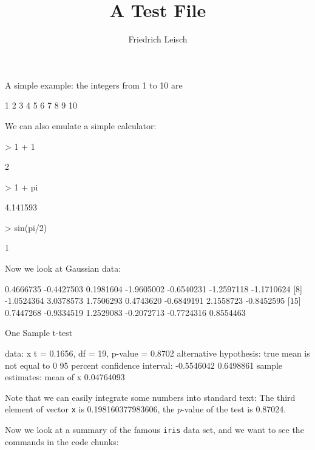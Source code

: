 \documentclass[a4paper]{article}
\title{A Test File}
\author{Friedrich Leisch}
\begin{document}
\maketitle

A simple example: the integers from 1 to 10 are
\begin{Schunk}
\begin{Soutput}
 [1]  1  2  3  4  5  6  7  8  9 10
\end{Soutput}
\end{Schunk}

We can also emulate a simple calculator:
\begin{Schunk}
\begin{Sinput}
> 1 + 1
\end{Sinput}
\begin{Soutput}
[1] 2
\end{Soutput}
\begin{Sinput}
> 1 + pi
\end{Sinput}
\begin{Soutput}
[1] 4.141593
\end{Soutput}
\begin{Sinput}
> sin(pi/2)
\end{Sinput}
\begin{Soutput}
[1] 1
\end{Soutput}
\end{Schunk}

Now we look at Gaussian data:

\begin{Schunk}
\begin{Soutput}
 [1]  0.4666735 -0.4427503  0.1981604 -1.9605002 -0.6540231 -1.2597118 -1.1710624
 [8] -1.0524364  3.0378573  1.7506293  0.4743620 -0.6849191  2.1558723 -0.8452595
[15]  0.7447268 -0.9334519  1.2529083 -0.2072713 -0.7724316  0.8554463
\end{Soutput}
\begin{Soutput}
	One Sample t-test

data:  x
t = 0.1656, df = 19, p-value = 0.8702
alternative hypothesis: true mean is not equal to 0
95 percent confidence interval:
 -0.5546042  0.6498861
sample estimates:
 mean of x 
0.04764093 
\end{Soutput}
\end{Schunk}
Note that we can easily integrate some numbers into standard text: The
third element of vector \texttt{x} is 0.198160377983606, the
$p$-value of the test is 0.87024. %

Now we look at a summary of the famous \texttt{iris} data set, and we
want to see the commands in the code chunks:
\end{document}

